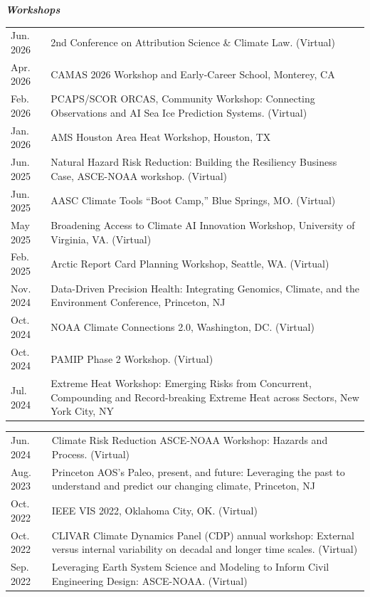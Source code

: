 \documentclass[margin,line,palatino,courier,10pt]{res}
\begin{document}
\begin{resume}
\textit{\textbf{Workshops}}
\vspace*{0.05in}\\
\begin{tabular}{@{}p{0.9in}p{4in}}
Jun. 2026 & 2nd Conference on Attribution Science \& Climate Law. (Virtual)\\
Apr. 2026 & CAMAS 2026 Workshop and Early-Career School, Monterey, CA\\
Feb. 2026 & PCAPS/SCOR ORCAS, Community Workshop: Connecting Observations and AI Sea Ice Prediction Systems. (Virtual)\\
Jan. 2026 & AMS Houston Area Heat Workshop, Houston, TX\\
Jun. 2025 & Natural Hazard Risk Reduction: Building the Resiliency Business Case, ASCE-NOAA workshop. (Virtual)\\
Jun. 2025 & AASC Climate Tools ``Boot Camp,'' Blue Springs, MO. (Virtual)\\
May 2025 & Broadening Access to Climate AI Innovation Workshop, University of Virginia, VA. (Virtual)\\
Feb. 2025 & Arctic Report Card Planning Workshop, Seattle, WA. (Virtual)\\
Nov. 2024 & Data-Driven Precision Health: Integrating Genomics, Climate, and the Environment Conference, Princeton, NJ\\
Oct. 2024 & NOAA Climate Connections 2.0, Washington, DC. (Virtual)\\
Oct. 2024 & PAMIP Phase 2 Workshop. (Virtual)\\
Jul. 2024 & Extreme Heat Workshop: Emerging Risks from Concurrent, Compounding and Record-breaking Extreme Heat across Sectors, New York City, NY\\
\end{tabular}
\begin{tabular}{@{}p{0.9in}p{4in}}
Jun. 2024 & Climate Risk Reduction ASCE-NOAA Workshop: Hazards and Process. (Virtual)\\
Aug. 2023 & Princeton AOS's Paleo, present, and future: Leveraging the past to understand and predict our changing climate, Princeton, NJ\\
Oct. 2022 & IEEE VIS 2022, Oklahoma City, OK. (Virtual)\\
Oct. 2022 & CLIVAR Climate Dynamics Panel (CDP) annual workshop: External versus internal variability on decadal and longer time scales. (Virtual)\\
Sep. 2022 & Leveraging Earth System Science and Modeling to Inform Civil Engineering Design: ASCE-NOAA. (Virtual)\\

\end{tabular}
\end{resume}
\end{document}
